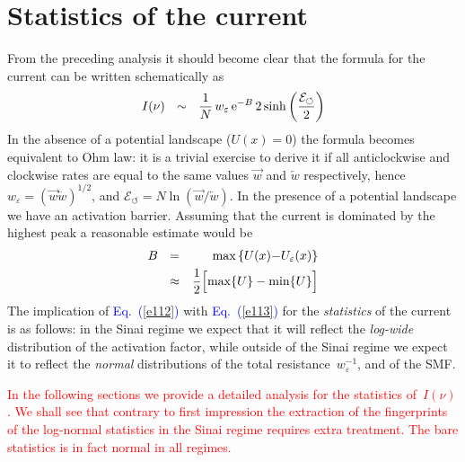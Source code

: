 \documentclass[aps,pre,floats,floatfix,twocolumn]{revtex4}
\newcommand{\eexp}{\mbox{e}^}
\newcommand{\mylabel}[1]{\label{#1}}
\newcommand{\eeq}{\end{eqnarray}}
\newcommand{\be}[1]{\begin{eqnarray}\ifthenelse{#1=-1}
{\nonumber}{\ifthenelse{#1=0}{}{\mylabel{e#1}}}}
\newcommand{\Eq}[1]{\textcolor{blue}{Eq.\!\!~(\ref{#1})}}
\newcommand{\rmrk}[1]{\textcolor{red}{#1}}
\begin{document}
\section{Statistics of the current}
\label{sec:stat}

From the preceding analysis it should become clear that 
the formula for the current can be written schematically as 
%
\be{112}
I(\nu) \ \ \sim \ \  \frac{1}{N} \, w_{\varepsilon} \, \eexp{-B} \, 2\sinh\left(\frac{\mathcal{E}_{\circlearrowleft}}{2}\right)
\eeq
%
In the absence of a potential landscape ($U(x)=0$) the formula becomes equivalent to Ohm law: 
it is a trivial exercise to derive it if all anticlockwise and clockwise rates are equal 
to the same values $\overrightarrow{w}$ and $\overleftarrow{w}$ respectively, 
hence $w_{\varepsilon}=(\overrightarrow{w} \overleftarrow{w})^{1/2}$, 
and ${\mathcal{E}_{\circlearrowleft}=N\ln(\overrightarrow{w}/\overleftarrow{w})}$.   
In the presence of a potential landscape we have an activation barrier.
Assuming that the current is dominated by the highest peak 
a reasonable estimate would be
%
\be{113}
B \ \ &=&  \ \ \text{max}\left\{ U(x){-}U_{\varepsilon}(x) \right\} 
\\ \label{e114} 
&\approx& \frac{1}{2} \Big[ \text{max}\{U\} - \text{min}\{U\} \Big]  
\eeq 
%
The implication of \Eq{e112} with \Eq{e113} for the {\em statistics} of the current 
is as follows: in the Sinai regime we expect that it will reflect 
the {\em log-wide} distribution of the activation factor, 
while outside of the Sinai regime we expect it to reflect the {\em normal} distributions 
of the total resistance~$w_{\varepsilon}^{-1}$, and of the SMF.  

\rmrk{In the following sections we provide a detailed analysis for the statistics of~$I(\nu)$. 
We shall see that contrary to first impression the extraction 
of the fingerprints of the log-normal statistics in the Sinai regime 
requires extra treatment. The bare statistics is in fact normal in all regimes. }  
\end{document}
